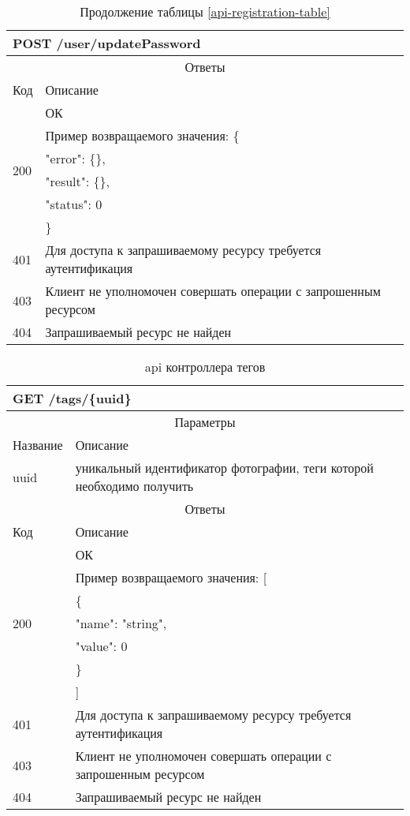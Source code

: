 \begin{table}[H]
  \caption*{Продолжение таблицы \ref{api-registration-table}}
  \begin{tabular}{|p{6cm}|p{10cm}|}
  \hline \multicolumn{2}{|l|}{POST /user/updatePassword} \\
  \hline \multicolumn{2}{|c|}{Ответы} \\
  \hline Код & Описание \\
  \hline \multirow{6}{=}{200} & ОК \\
   & Пример возвращаемого значения: \{ \\
   & "error": \{\}, \\
   & "result": \{\}, \\
   & "status": 0 \\
   & \} \\
  \hline 401 & Для доступа к запрашиваемому ресурсу требуется аутентификация \\
  \hline 403 & Клиент не уполномочен совершать операции с запрошенным ресурсом \\
  \hline 404 & Запрашиваемый ресурс не найден \\
  \hline
  \end{tabular}
\end{table}

\begin{table}[H]
  \caption{api контроллера тегов}\label{use-case-15-table}
  \begin{tabular}{|p{6cm}|p{10cm}|}
  \hline \multicolumn{2}{|l|}{GET /tags/\{uuid\}} \\
  \hline \multicolumn{2}{|c|}{Параметры} \\
  \hline Название & Описание \\
  \hline uuid & уникальный идентификатор фотографии, теги которой необходимо получить \\
  \hline \multicolumn{2}{|c|}{Ответы} \\
  \hline Код & Описание \\
  \hline \multirow{7}{=}{200} & ОК \\
   & Пример возвращаемого значения: [ \\
   & \{ \\
   & "name": "string", \\
   & "value": 0 \\
   & \} \\
   & ] \\
  \hline 401 & Для доступа к запрашиваемому ресурсу требуется аутентификация \\
  \hline 403 & Клиент не уполномочен совершать операции с запрошенным ресурсом \\
  \hline 404 & Запрашиваемый ресурс не найден \\
  \hline
  \end{tabular}
\end{table}


